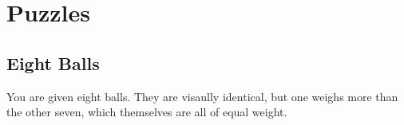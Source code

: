 \documentclass[12pt]{article}
\begin{document}
	
	\pagebreak

	
	\pagebreak

	
	\pagebreak

	
	\pagebreak

	
	\pagebreak

	\normalsize
	\section{Puzzles}
	\subsection{Eight Balls}
	You are given eight balls. They are visaully identical, but one weighs more than the other seven, which themselves are all of equal weight.
\end{document}
